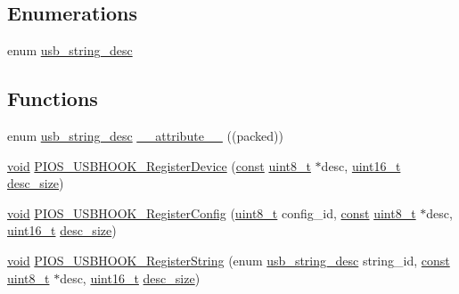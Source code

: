 \subsection*{Enumerations}
\begin{DoxyCompactItemize}
\item 
enum \hyperlink{group___p_i_o_s___u_s_b_h_o_o_k_ga5a1ae5206971f0c296fa30b24e8725da}{usb\-\_\-string\-\_\-desc} 
\end{DoxyCompactItemize}
\subsection*{Functions}
\begin{DoxyCompactItemize}
\item 
enum \hyperlink{group___p_i_o_s___u_s_b_h_o_o_k_ga5a1ae5206971f0c296fa30b24e8725da}{usb\-\_\-string\-\_\-desc} \hyperlink{group___p_i_o_s___u_s_b_h_o_o_k_ga7c85e72dd0b0db640d1db8abb5427715}{\-\_\-\-\_\-attribute\-\_\-\-\_\-} ((packed))
\item 
\hyperlink{group___n_a_m_e_ga18028b8badbf1ea7e704ccac3c488e82}{void} \hyperlink{group___p_i_o_s___u_s_b_h_o_o_k_ga59b142c7def8bcde4564793de82198d6}{P\-I\-O\-S\-\_\-\-U\-S\-B\-H\-O\-O\-K\-\_\-\-Register\-Device} (\hyperlink{group___n_a_m_e_ga7ae6d0e43244213b34de2c2b9aa30da6}{const} \hyperlink{stdint_8h_aba7bc1797add20fe3efdf37ced1182c5}{uint8\-\_\-t} $\ast$desc, \hyperlink{stdint_8h_a273cf69d639a59973b6019625df33e30}{uint16\-\_\-t} \hyperlink{posix_2inc_2pios__board__info_8h_ae5d617056baa2cb80f47bfcef73f2b69}{desc\-\_\-size})
\item 
\hyperlink{group___n_a_m_e_ga18028b8badbf1ea7e704ccac3c488e82}{void} \hyperlink{group___p_i_o_s___u_s_b_h_o_o_k_gaf98576e0b9228288e852901754ab9759}{P\-I\-O\-S\-\_\-\-U\-S\-B\-H\-O\-O\-K\-\_\-\-Register\-Config} (\hyperlink{stdint_8h_aba7bc1797add20fe3efdf37ced1182c5}{uint8\-\_\-t} config\-\_\-id, \hyperlink{group___n_a_m_e_ga7ae6d0e43244213b34de2c2b9aa30da6}{const} \hyperlink{stdint_8h_aba7bc1797add20fe3efdf37ced1182c5}{uint8\-\_\-t} $\ast$desc, \hyperlink{stdint_8h_a273cf69d639a59973b6019625df33e30}{uint16\-\_\-t} \hyperlink{posix_2inc_2pios__board__info_8h_ae5d617056baa2cb80f47bfcef73f2b69}{desc\-\_\-size})
\item 
\hyperlink{group___n_a_m_e_ga18028b8badbf1ea7e704ccac3c488e82}{void} \hyperlink{group___p_i_o_s___u_s_b_h_o_o_k_gab472720c22eb46c81e7f6739dc53117b}{P\-I\-O\-S\-\_\-\-U\-S\-B\-H\-O\-O\-K\-\_\-\-Register\-String} (enum \hyperlink{group___p_i_o_s___u_s_b_h_o_o_k_ga5a1ae5206971f0c296fa30b24e8725da}{usb\-\_\-string\-\_\-desc} string\-\_\-id, \hyperlink{group___n_a_m_e_ga7ae6d0e43244213b34de2c2b9aa30da6}{const} \hyperlink{stdint_8h_aba7bc1797add20fe3efdf37ced1182c5}{uint8\-\_\-t} $\ast$desc, \hyperlink{stdint_8h_a273cf69d639a59973b6019625df33e30}{uint16\-\_\-t} \hyperlink{posix_2inc_2pios__board__info_8h_ae5d617056baa2cb80f47bfcef73f2b69}{desc\-\_\-size})

\end{DoxyCompactItemize}
